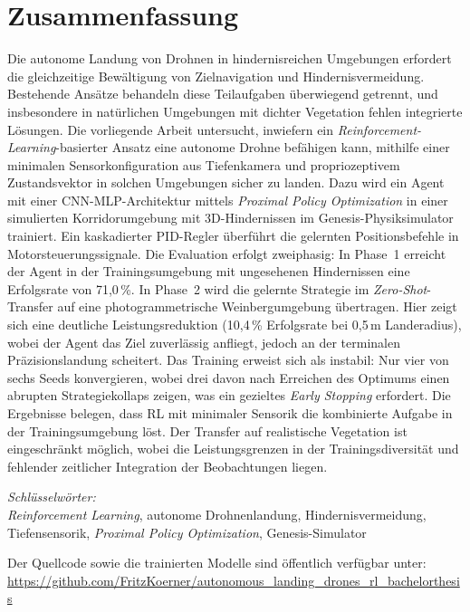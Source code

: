 \chapter*{Zusammenfassung}
\thispagestyle{empty}
Die autonome Landung von Drohnen in hindernisreichen Umgebungen erfordert die gleichzeitige Bewältigung von Zielnavigation und Hindernisvermeidung. Bestehende Ansätze behandeln diese Teilaufgaben überwiegend getrennt, und insbesondere in natürlichen Umgebungen mit dichter Vegetation fehlen integrierte Lösungen. Die vorliegende Arbeit untersucht, inwiefern ein \textit{Reinforcement-Learning}-basierter Ansatz eine autonome Drohne befähigen kann, mithilfe einer minimalen Sensorkonfiguration aus Tiefenkamera und propriozeptivem Zustandsvektor in solchen Umgebungen sicher zu landen. Dazu wird ein Agent mit einer CNN-MLP-Architektur mittels \textit{Proximal Policy Optimization} in einer simulierten Korridorumgebung mit 3D-Hindernissen im Genesis-Physiksimulator trainiert. Ein kaskadierter PID-Regler überführt die gelernten Positionsbefehle in Motorsteuerungssignale. Die Evaluation erfolgt zweiphasig: In Phase~1 erreicht der Agent in der Trainingsumgebung mit ungesehenen Hindernissen eine Erfolgsrate von 71,0\,\%. In Phase~2 wird die gelernte Strategie im \textit{Zero-Shot}-Transfer auf eine photogrammetrische Weinbergumgebung übertragen. Hier zeigt sich eine deutliche Leistungsreduktion (10,4\,\% Erfolgsrate bei 0,5\,m Landeradius), wobei der Agent das Ziel zuverlässig anfliegt, jedoch an der terminalen Präzisionslandung scheitert. Das Training erweist sich als instabil: Nur vier von sechs Seeds konvergieren, wobei drei davon nach Erreichen des Optimums einen abrupten Strategiekollaps zeigen, was ein gezieltes \textit{Early Stopping} erfordert. Die Ergebnisse belegen, dass RL mit minimaler Sensorik die kombinierte Aufgabe in der Trainingsumgebung löst. Der Transfer auf realistische Vegetation ist eingeschränkt möglich, wobei die Leistungsgrenzen in der Trainingsdiversität und fehlender zeitlicher Integration der Beobachtungen liegen.

\emph{Schlüsselwörter:} \\
\textit{Reinforcement Learning}, autonome Drohnenlandung, Hindernisvermeidung, Tiefensensorik, \textit{Proximal Policy Optimization}, Genesis-Simulator

\bigskip
\noindent Der Quellcode sowie die trainierten Modelle sind öffentlich verfügbar unter:\\
\url{https://github.com/FritzKoerner/autonomous_landing_drones_rl_bachelorthesis}